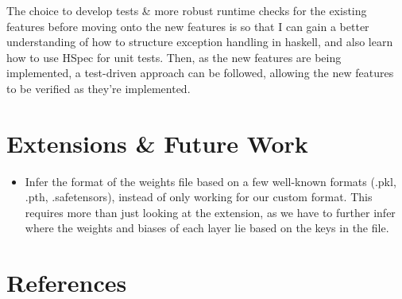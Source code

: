 \documentclass[12pt, titlepage]{article}
\begin{document}
The choice to develop tests \& more robust runtime checks for the existing features before moving onto the new features is so that I can gain a better understanding of how to structure exception handling in haskell, and also learn how to use HSpec for unit tests. Then, as the new features are being implemented, a test-driven approach can be followed, allowing the new features to be verified as they're implemented.

\section{Extensions \& Future Work}
\begin{itemize}
	\item Infer the format of the weights file based on a few well-known formats (.pkl, .pth, .safetensors), instead of only working for our custom format. This requires more than just looking at the extension, as we have to further infer where the weights and biases of each layer lie based on the keys in the file. 
\end{itemize}

\section{References}
\end{document}
